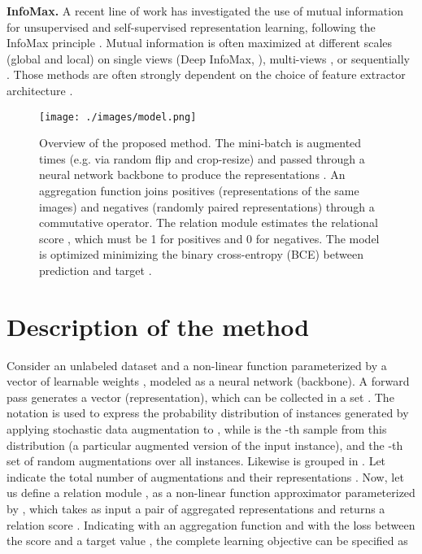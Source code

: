 \documentclass{article}
\begin{document}
\textbf{InfoMax.} A recent line of work has investigated the use of mutual information for unsupervised and self-supervised representation learning, following the InfoMax principle \citep{linsker1988self}.
Mutual information is often maximized at different scales (global and local) on single views (Deep InfoMax, \citealt{hjelm2018learning}), multi-views \citep{bachman2019learning, ji2019invariant}, or sequentially \citep{oord2018representation}.
Those methods are often strongly dependent on the choice of feature extractor architecture \citep{tschannen2020mutual}.

\begin{figure}[t]
 \centering
 \texttt{[image: ./images/model.png]}
 \caption{Overview of the proposed method. The mini-batch  is augmented  times (e.g. via random flip and crop-resize) and passed through a neural network backbone  to produce the representations . An aggregation function  joins positives (representations of the same images) and negatives (randomly paired representations) through a commutative operator. The relation module  estimates the relational score , which must be 1 for positives and 0 for negatives. The model is optimized minimizing the binary cross-entropy (BCE) between prediction and target .}
 \label{fig:model_overview}
\end{figure}

\section{Description of the method}\label{sec:method}

Consider an unlabeled dataset  and a non-linear function  parameterized by a vector of learnable weights , modeled as a neural network (backbone). A forward pass generates a vector  (representation), which can be collected in a set .
The notation  is used to express the probability distribution of instances generated by applying stochastic data augmentation to , while  is the -th sample from this distribution (a particular augmented version of the input instance), and  the -th set of random augmentations over all instances.
Likewise  is grouped in . Let  indicate the total number of augmentations  and their representations .
Now, let us define a relation module , as a non-linear function approximator parameterized by , which takes as input a pair of aggregated representations and returns a relation score . Indicating with  an aggregation function and with  the loss between the score and a target value , the complete learning objective can be specified as
\end{document}
